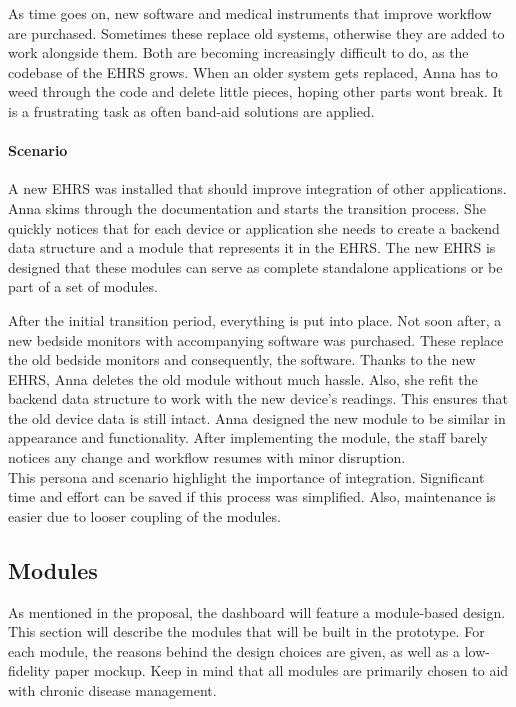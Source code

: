         As time goes on, new software and medical instruments that improve workflow are purchased. Sometimes these replace old systems, otherwise they are added to work alongside them. Both are becoming increasingly difficult to do, as the codebase of the EHRS grows. When an older system gets replaced, Anna has to weed through the code and delete little pieces, hoping other parts wont break. It is a frustrating task as often band-aid solutions are applied.

        \paragraph{Scenario} A new EHRS was installed that should improve integration of other applications. Anna skims through the documentation and starts the transition process. She quickly notices that for each device or application she needs to create a backend data structure and a module that represents it in the EHRS. The new EHRS is designed that these modules can serve as complete standalone applications or be part of a set of modules.

        After the initial transition period, everything is put into place. Not soon after, a new bedside monitors with accompanying software was purchased. These replace the old bedside monitors and consequently, the software. Thanks to the new EHRS, Anna deletes the old module without much hassle. Also, she refit the backend data structure to work with the new device's readings. This ensures that the old device data is still intact. Anna designed the new module to be similar in appearance and functionality. After implementing the module, the staff barely notices any change and workflow resumes with minor disruption.\\

        \noindent This persona and scenario highlight the importance of integration. Significant time and effort can be saved if this process was simplified. Also, maintenance is easier due to looser coupling of the modules.

    \subsection{Modules} \label{design_modules}
    
    As mentioned in the proposal, the dashboard will feature a module-based design. This section will describe the modules that will be built in the prototype. For each module, the reasons behind the design choices are given, as well as a low-fidelity paper mockup. Keep in mind that all modules are primarily chosen to aid with chronic disease management.

